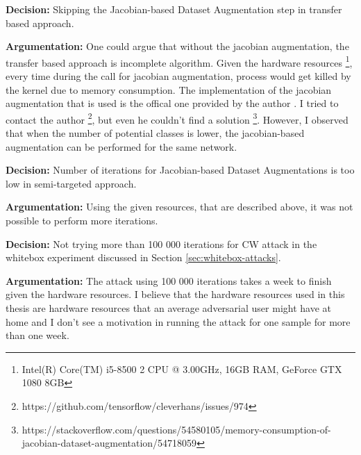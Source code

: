 \textbf{Decision:} Skipping the Jacobian-based Dataset Augmentation step in transfer based approach.

\textbf{Argumentation:} One could argue that without the jacobian augmentation, the transfer based approach is incomplete algorithm. Given the hardware resources \footnote{Intel(R) Core(TM) i5-8500 2 CPU @ 3.00GHz, 16GB RAM, GeForce GTX 1080 8GB}, every time during the call for jacobian augmentation, process would get killed by the kernel due to memory consumption. The implementation of the jacobian augmentation that is used is the offical one provided by the author \cite{papernot2018cleverhans}. I tried to contact the author \footnote{https://github.com/tensorflow/cleverhans/issues/974}, but even he couldn't find a solution \footnote{https://stackoverflow.com/questions/54580105/memory-consumption-of-jacobian-dataset-augmentation/54718059}. However, I observed that when the number of potential classes is lower, the jacobian-based augmentation can be performed for the same network.

\textbf{Decision:} Number of iterations for Jacobian-based Dataset Augmentations is too low in semi-targeted approach.

\textbf{Argumentation: } Using the given resources, that are described above, it was not possible to perform more iterations.

\textbf{Decision:} 
Not trying more than 100 000 iterations for CW attack in the whitebox experiment discussed in Section \ref{sec:whitebox-attacks}.

\textbf{Argumentation:}
The attack using 100 000 iterations takes a week to finish given the hardware resources. I believe that the hardware resources used in this thesis are hardware resources that an average adversarial user might have at home and I don't see a motivation in running the attack for one sample for more than one week.